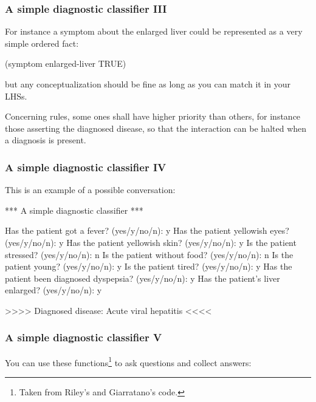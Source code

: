 \documentclass[xcolor={usenames,dvipsnames,svgnames}, compress]{beamer}
\begin{document}
\begin{frame}[fragile]
  \frametitle{A simple diagnostic classifier III}
  For instance a symptom about the enlarged liver could be represented
  as a very simple ordered fact:
  \begin{clips-code}[numbers=none]
    (symptom enlarged-liver TRUE)
  \end{clips-code}
  but any conceptualization should be fine as long as you can match it
  in your LHSs.\par\bigskip

  Concerning rules, some ones shall have higher priority than others,
  for instance those asserting the diagnosed disease, so that the
  interaction can be halted when a diagnosis is present.
\end{frame}

\begin{frame}[fragile]
  \frametitle{A simple diagnostic classifier IV}
  This is an example of a possible conversation:
  \begin{clips-code}
    *** A simple diagnostic classifier ***

    Has the patient got a fever? (yes/y/no/n): y
    Has the patient yellowish eyes? (yes/y/no/n): y
    Has the patient yellowish skin? (yes/y/no/n): y
    Is the patient stressed? (yes/y/no/n): n
    Is the patient without food? (yes/y/no/n): n
    Is the patient young? (yes/y/no/n): y
    Is the patient tired? (yes/y/no/n): y
    Has the patient been diagnosed dyspepsia? (yes/y/no/n): y
    Has the patient's liver enlarged? (yes/y/no/n): y

    >>>> Diagnosed disease: Acute viral hepatitis <<<<
  \end{clips-code}
\end{frame}


\begin{frame}[fragile]
  \frametitle{A simple diagnostic classifier V}
  You can use these functions\footnote{Taken from Riley's and Giarratano's code.} to ask questions and collect
  answers:
\end{frame}
\end{document}
